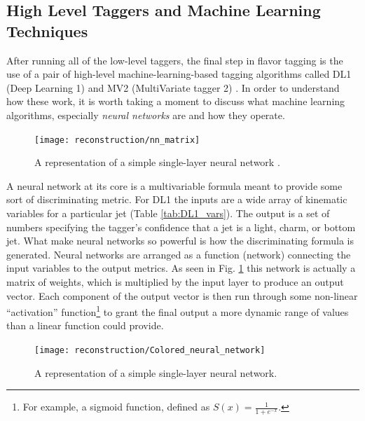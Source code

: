         \FloatBarrier
        \subsection{High Level Taggers and Machine Learning Techniques}\label{sec:ml_techniques}

            After running all of the low-level taggers,
                the final step in flavor tagging is the use of a pair of high-level machine-learning-based tagging algorithms
                called DL1 (Deep Learning 1) and MV2 (MultiVariate tagger 2)
                \cite{bjet_id_and_performance} \cite{btagging_optimisation}.
            In order to understand how these work, it is worth taking a moment to discuss what machine learning algorithms,
                especially \textit{neural networks} are and how they operate.

            \begin{figure}[tbh] \center
                \texttt{[image: reconstruction/nn\_matrix]}
                \caption{
                    A representation of a simple single-layer neural network \cite{intro_to_neural_networks}.
                }
                \label{fig:nn_matrix}
            \end{figure}

            A neural network at its core is a multivariable formula meant to provide some sort of discriminating metric\cite{MLatLHC}.
            For DL1 the inputs are a wide array of kinematic variables for a particular jet (Table \ref{tab:DL1_vars}).
            The output is a set of numbers specifying the tagger's confidence that a jet is
                a light, charm, or bottom jet.
            What make neural networks so powerful is how the discriminating formula is generated.
            Neural networks are arranged as a function (network) connecting the input variables to the output metrics. 
            As seen in Fig. \ref{fig:nn_matrix} this network is actually a matrix of weights,
                which is multiplied by the input layer to produce an output vector.
            Each component of the output vector is then run through some non-linear ``activation'' function\footnote{
                    For example, a sigmoid function, defined as $S(x) = \frac{1}{1+e^{-x}}$.
                } to grant the final output a more dynamic range of values than a linear function could provide.

            \begin{figure}[tbh] \center
                \texttt{[image: reconstruction/Colored\_neural\_network]}
                \caption{
                    A representation of a simple single-layer neural network\cite{colored_neural_network}.
                }
                \label{fig:colored_neural_network}
            \end{figure}


